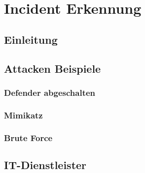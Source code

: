 \chapter{Incident Erkennung}
\section{Einleitung}



\section{Attacken Beispiele}

\subsection{Defender abgeschalten}


\subsection{Mimikatz}




\subsection{Brute Force}






\section{IT-Dienstleister}